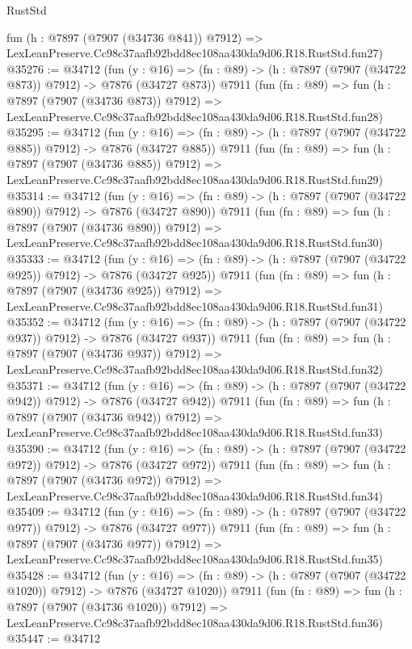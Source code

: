 \begin{lexlean}{RustStd}
\begin{coremodule}
    fun (h : @7897 (@7907 (@34736 @841)) @7912) =>
    LexLeanPreserve.Cc98c37aafb92bdd8ec108aa430da9d06.R18.RustStd.fun27)
@35276 := @34712
    (fun (y : @16) => (fn : @89) -> (h : @7897 (@7907 (@34722 @873)) @7912) -> @7876 (@34727 @873))
    @7911
    (fun (fn : @89) =>
    fun (h : @7897 (@7907 (@34736 @873)) @7912) =>
    LexLeanPreserve.Cc98c37aafb92bdd8ec108aa430da9d06.R18.RustStd.fun28)
@35295 := @34712
    (fun (y : @16) => (fn : @89) -> (h : @7897 (@7907 (@34722 @885)) @7912) -> @7876 (@34727 @885))
    @7911
    (fun (fn : @89) =>
    fun (h : @7897 (@7907 (@34736 @885)) @7912) =>
    LexLeanPreserve.Cc98c37aafb92bdd8ec108aa430da9d06.R18.RustStd.fun29)
@35314 := @34712
    (fun (y : @16) => (fn : @89) -> (h : @7897 (@7907 (@34722 @890)) @7912) -> @7876 (@34727 @890))
    @7911
    (fun (fn : @89) =>
    fun (h : @7897 (@7907 (@34736 @890)) @7912) =>
    LexLeanPreserve.Cc98c37aafb92bdd8ec108aa430da9d06.R18.RustStd.fun30)
@35333 := @34712
    (fun (y : @16) => (fn : @89) -> (h : @7897 (@7907 (@34722 @925)) @7912) -> @7876 (@34727 @925))
    @7911
    (fun (fn : @89) =>
    fun (h : @7897 (@7907 (@34736 @925)) @7912) =>
    LexLeanPreserve.Cc98c37aafb92bdd8ec108aa430da9d06.R18.RustStd.fun31)
@35352 := @34712
    (fun (y : @16) => (fn : @89) -> (h : @7897 (@7907 (@34722 @937)) @7912) -> @7876 (@34727 @937))
    @7911
    (fun (fn : @89) =>
    fun (h : @7897 (@7907 (@34736 @937)) @7912) =>
    LexLeanPreserve.Cc98c37aafb92bdd8ec108aa430da9d06.R18.RustStd.fun32)
@35371 := @34712
    (fun (y : @16) => (fn : @89) -> (h : @7897 (@7907 (@34722 @942)) @7912) -> @7876 (@34727 @942))
    @7911
    (fun (fn : @89) =>
    fun (h : @7897 (@7907 (@34736 @942)) @7912) =>
    LexLeanPreserve.Cc98c37aafb92bdd8ec108aa430da9d06.R18.RustStd.fun33)
@35390 := @34712
    (fun (y : @16) => (fn : @89) -> (h : @7897 (@7907 (@34722 @972)) @7912) -> @7876 (@34727 @972))
    @7911
    (fun (fn : @89) =>
    fun (h : @7897 (@7907 (@34736 @972)) @7912) =>
    LexLeanPreserve.Cc98c37aafb92bdd8ec108aa430da9d06.R18.RustStd.fun34)
@35409 := @34712
    (fun (y : @16) => (fn : @89) -> (h : @7897 (@7907 (@34722 @977)) @7912) -> @7876 (@34727 @977))
    @7911
    (fun (fn : @89) =>
    fun (h : @7897 (@7907 (@34736 @977)) @7912) =>
    LexLeanPreserve.Cc98c37aafb92bdd8ec108aa430da9d06.R18.RustStd.fun35)
@35428 := @34712
    (fun (y : @16) =>
    (fn : @89) -> (h : @7897 (@7907 (@34722 @1020)) @7912) -> @7876 (@34727 @1020))
    @7911
    (fun (fn : @89) =>
    fun (h : @7897 (@7907 (@34736 @1020)) @7912) =>
    LexLeanPreserve.Cc98c37aafb92bdd8ec108aa430da9d06.R18.RustStd.fun36)
@35447 := @34712

\end{coremodule}
\end{lexlean}

